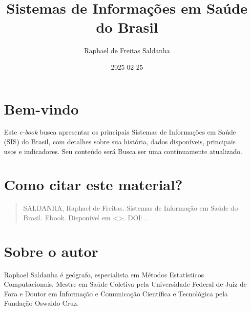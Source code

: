 \documentclass[
  letterpaper,
  DIV=11,
  numbers=noendperiod]{scrreprt}
\title{Sistemas de Informações em Saúde do Brasil}
\author{Raphael de Freitas Saldanha}
\date{2025-02-25}
\renewcommand*\contentsname{Índice}
\newcommand\contentsname{Índice}
\begin{document}
\maketitle

\renewcommand*\contentsname{Índice}
{
\hypersetup{linkcolor=}
\setcounter{tocdepth}{2}
\tableofcontents
}


\chapter*{Bem-vindo}\label{bem-vindo}


Este \emph{e-book} busca apresentar os principais Sistemas de
Informações em Saúde (SIS) do Brasil, com detalhes sobre sua história,
dados disponíveis, principais usos e indicadores. Seu conteúdo será
Busca ser uma continuamente atualizado.


\chapter*{Como citar este material?}\label{como-citar-este-material}


\begin{quote}
SALDANHA, Raphael de Freitas. Sistemas de Informação em Saúde do Brasil.
Ebook. Disponível em \textless\textgreater. DOI: .
\end{quote}


\chapter*{Sobre o autor}\label{sobre-o-autor}


Raphael Saldanha é geógrafo, especialista em Métodos Estatísticos
Computacionais, Mestre em Saúde Coletiva pela Universidade Federal de
Juiz de Fora e Doutor em Informação e Comunicação Científica e
Tecnológica pela Fundação Oswaldo Cruz.

\end{document}
